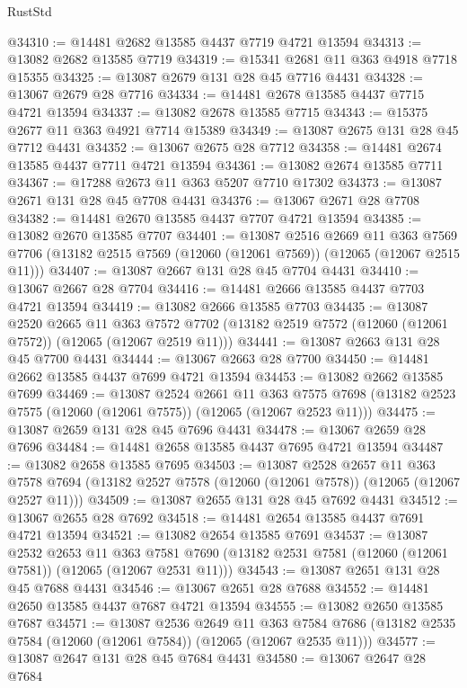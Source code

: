 \begin{lexlean}{RustStd}
\begin{coremodule}
@34310 := @14481 @2682 @13585 @4437 @7719 @4721 @13594
@34313 := @13082 @2682 @13585 @7719
@34319 := @15341 @2681 @11 @363 @4918 @7718 @15355
@34325 := @13087 @2679 @131 @28 @45 @7716 @4431
@34328 := @13067 @2679 @28 @7716
@34334 := @14481 @2678 @13585 @4437 @7715 @4721 @13594
@34337 := @13082 @2678 @13585 @7715
@34343 := @15375 @2677 @11 @363 @4921 @7714 @15389
@34349 := @13087 @2675 @131 @28 @45 @7712 @4431
@34352 := @13067 @2675 @28 @7712
@34358 := @14481 @2674 @13585 @4437 @7711 @4721 @13594
@34361 := @13082 @2674 @13585 @7711
@34367 := @17288 @2673 @11 @363 @5207 @7710 @17302
@34373 := @13087 @2671 @131 @28 @45 @7708 @4431
@34376 := @13067 @2671 @28 @7708
@34382 := @14481 @2670 @13585 @4437 @7707 @4721 @13594
@34385 := @13082 @2670 @13585 @7707
@34401 := @13087
    @2516
    @2669
    @11
    @363
    @7569
    @7706
    (@13182 @2515 @7569 (@12060 (@12061 @7569)) (@12065 (@12067 @2515 @11)))
@34407 := @13087 @2667 @131 @28 @45 @7704 @4431
@34410 := @13067 @2667 @28 @7704
@34416 := @14481 @2666 @13585 @4437 @7703 @4721 @13594
@34419 := @13082 @2666 @13585 @7703
@34435 := @13087
    @2520
    @2665
    @11
    @363
    @7572
    @7702
    (@13182 @2519 @7572 (@12060 (@12061 @7572)) (@12065 (@12067 @2519 @11)))
@34441 := @13087 @2663 @131 @28 @45 @7700 @4431
@34444 := @13067 @2663 @28 @7700
@34450 := @14481 @2662 @13585 @4437 @7699 @4721 @13594
@34453 := @13082 @2662 @13585 @7699
@34469 := @13087
    @2524
    @2661
    @11
    @363
    @7575
    @7698
    (@13182 @2523 @7575 (@12060 (@12061 @7575)) (@12065 (@12067 @2523 @11)))
@34475 := @13087 @2659 @131 @28 @45 @7696 @4431
@34478 := @13067 @2659 @28 @7696
@34484 := @14481 @2658 @13585 @4437 @7695 @4721 @13594
@34487 := @13082 @2658 @13585 @7695
@34503 := @13087
    @2528
    @2657
    @11
    @363
    @7578
    @7694
    (@13182 @2527 @7578 (@12060 (@12061 @7578)) (@12065 (@12067 @2527 @11)))
@34509 := @13087 @2655 @131 @28 @45 @7692 @4431
@34512 := @13067 @2655 @28 @7692
@34518 := @14481 @2654 @13585 @4437 @7691 @4721 @13594
@34521 := @13082 @2654 @13585 @7691
@34537 := @13087
    @2532
    @2653
    @11
    @363
    @7581
    @7690
    (@13182 @2531 @7581 (@12060 (@12061 @7581)) (@12065 (@12067 @2531 @11)))
@34543 := @13087 @2651 @131 @28 @45 @7688 @4431
@34546 := @13067 @2651 @28 @7688
@34552 := @14481 @2650 @13585 @4437 @7687 @4721 @13594
@34555 := @13082 @2650 @13585 @7687
@34571 := @13087
    @2536
    @2649
    @11
    @363
    @7584
    @7686
    (@13182 @2535 @7584 (@12060 (@12061 @7584)) (@12065 (@12067 @2535 @11)))
@34577 := @13087 @2647 @131 @28 @45 @7684 @4431
@34580 := @13067 @2647 @28 @7684

\end{coremodule}
\end{lexlean}
